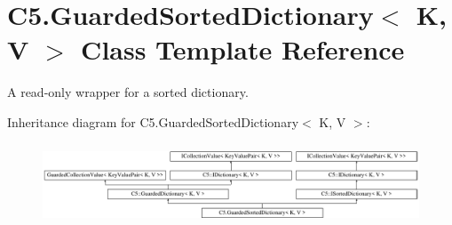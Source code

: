 \hypertarget{class_c5_1_1_guarded_sorted_dictionary}{}\section{C5.\+Guarded\+Sorted\+Dictionary$<$ K, V $>$ Class Template Reference}
\label{class_c5_1_1_guarded_sorted_dictionary}


A read-\/only wrapper for a sorted dictionary.  


Inheritance diagram for C5.\+Guarded\+Sorted\+Dictionary$<$ K, V $>$\+:\begin{figure}[H]
\begin{center}
\leavevmode
\includegraphics[height=2.448087cm]{class_c5_1_1_guarded_sorted_dictionary}
\end{center}
\end{figure}
